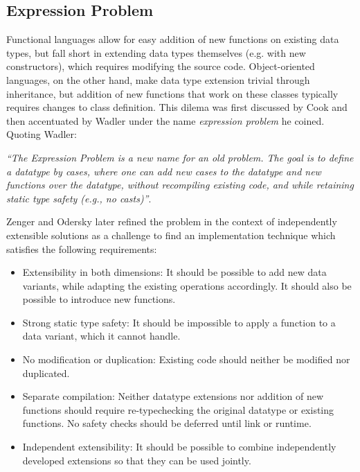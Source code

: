 \documentclass[preprint]{sigplanconf}
\begin{document}
\subsection{Expression Problem}

Functional languages allow for easy addition of new functions on existing data 
types, but fall short in extending data types themselves (e.g. with new constructors), 
which requires modifying the source code. Object-oriented languages, on the 
other hand, make data type extension trivial through inheritance, but addition 
of new functions that work on these classes typically requires changes to class 
definition. This dilema was first discussed by Cook\cite{Cook90} and then 
accentuated by Wadler\cite{exprproblem} under the name \emph{expression problem} 
he coined. Quoting Wadler:

\emph{``The Expression Problem is a new name for an old problem. The goal is
to define a datatype by cases, where one can add new cases to the
datatype and new functions over the datatype, without recompiling
existing code, and while retaining static type safety (e.g., no
casts)''}.

Zenger and Odersky later refined the problem in the context of independently 
extensible solutions\cite{fool12} as a challenge to find an implementation 
technique which satisfies the following requirements:

\begin{itemize}
\item Extensibility in both dimensions: It should be possible to add new data 
      variants, while adapting the existing operations accordingly. It should 
      also be possible to introduce new functions.
\item Strong static type safety: It should be impossible to apply a function to 
      a data variant, which it cannot handle.
\item No modification or duplication: Existing code should neither be modified 
      nor duplicated.
\item Separate compilation: Neither datatype extensions nor addition of new 
      functions should require re-typechecking the original datatype or 
      existing functions. No safety checks should be deferred until link or 
      runtime.
\item Independent extensibility: It should be possible to combine independently 
      developed extensions so that they can be used jointly.
\end{itemize}
\end{document}
